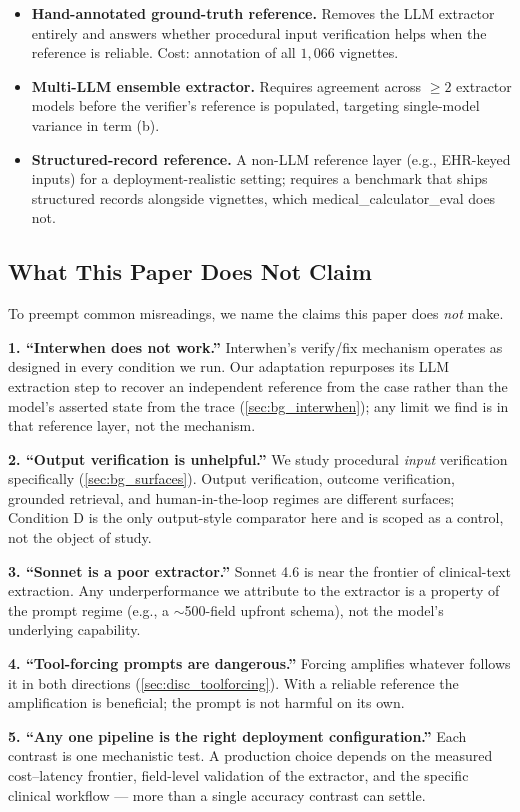 \begin{itemize}\setlength\itemsep{2pt}
  \item \textbf{Hand-annotated ground-truth reference.} Removes the LLM
        extractor entirely and answers whether procedural input
        verification helps when the reference is reliable. Cost:
        annotation of all $1{,}066$ vignettes.
  \item \textbf{Multi-LLM ensemble extractor.} Requires agreement
        across $\ge 2$ extractor models before the verifier's reference
        is populated, targeting single-model variance in term (b).
  \item \textbf{Structured-record reference.} A non-LLM reference layer
        (e.g., EHR-keyed inputs) for a deployment-realistic setting;
        requires a benchmark that ships structured records alongside
        vignettes, which medical\_calculator\_eval does not.
\end{itemize}

\subsection{What This Paper Does Not Claim}
\label{sec:disc_notclaim}

To preempt common misreadings, we name the claims this paper does
\emph{not} make.

\textbf{1. ``Interwhen does not work.''} Interwhen's verify/fix
mechanism operates as designed in every condition we run. Our
adaptation repurposes its LLM extraction step to recover an independent
reference from the case rather than the model's asserted state from the
trace (\cref{sec:bg_interwhen}); any limit we find is in that reference
layer, not the mechanism.

\textbf{2. ``Output verification is unhelpful.''} We study procedural
\emph{input} verification specifically (\cref{sec:bg_surfaces}). Output
verification, outcome verification, grounded retrieval, and
human-in-the-loop regimes are different surfaces; Condition D is the
only output-style comparator here and is scoped as a control, not the
object of study.

\textbf{3. ``Sonnet is a poor extractor.''} Sonnet 4.6 is near the
frontier of clinical-text extraction. Any underperformance we attribute
to the extractor is a property of the prompt regime (e.g., a
$\sim$500-field upfront schema), not the model's underlying capability.

\textbf{4. ``Tool-forcing prompts are dangerous.''} Forcing amplifies
whatever follows it in both directions (\cref{sec:disc_toolforcing}).
With a reliable reference the amplification is beneficial; the prompt
is not harmful on its own.

\textbf{5. ``Any one pipeline is the right deployment configuration.''}
Each contrast is one mechanistic test. A production choice depends on
the measured cost--latency frontier, field-level validation of the
extractor, and the specific clinical workflow --- more than a single
accuracy contrast can settle.
